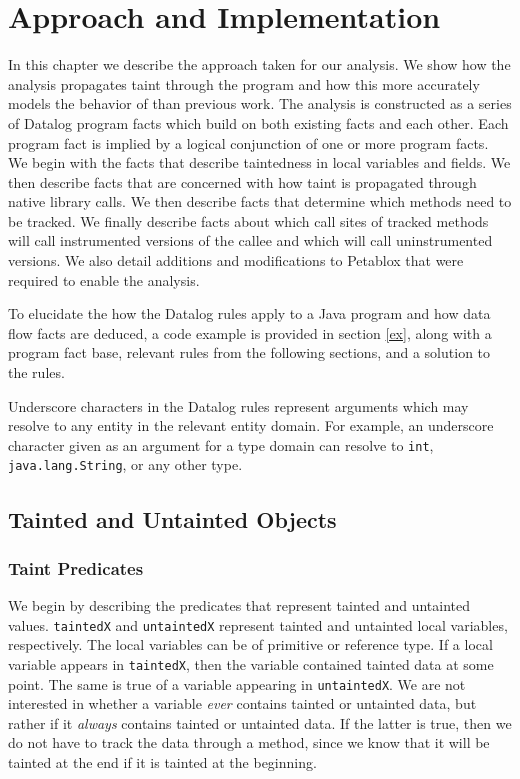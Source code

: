 \chapter{Approach and Implementation}
In this chapter we describe the approach taken for our analysis. We
show how the analysis propagates taint through the program and how
this more accurately models the behavior of \phosphor{} than previous
work. The analysis is constructed as a series of Datalog program facts
which build on both existing facts and each other. Each program fact
is implied by a logical conjunction of one or more program facts. We
begin with the facts that describe taintedness in local variables and
fields. We then describe facts that are concerned with how taint is
propagated through native library calls. We then describe facts that
determine which methods need to be tracked. We finally describe facts
about which call sites of tracked methods will call instrumented
versions of the callee and which will call uninstrumented versions. We
also detail additions and modifications to Petablox that were required
to enable the analysis.

To elucidate the how the Datalog rules apply to a Java program and how
data flow facts are deduced, a code example is provided in section
\ref{ex}, along with a program fact base, relevant rules from the
following sections, and a solution to the rules.

Underscore characters in the Datalog rules represent arguments which
may resolve to any entity in the relevant entity domain. For example,
an underscore character given as an argument for a type domain can
resolve to \texttt{int}, \texttt{java.lang.String}, or any other type.

\section{Tainted and Untainted Objects}
\subsection{Taint Predicates}
We begin by describing the predicates that represent tainted and
untainted values. \texttt{taintedX} and \texttt{untaintedX} represent
tainted and untainted local variables, respectively. The local
variables can be of primitive or reference type. If a local variable
appears in \texttt{taintedX}, then the variable contained tainted data
at some point. The same is true of a variable appearing in
\texttt{untaintedX}. We are not interested in whether a variable
\textit{ever} contains tainted or untainted data, but rather if it
\textit{always} contains tainted or untainted data. If the latter is
true, then we do not have to track the data through a method, since we
know that it will be tainted at the end if it is tainted at the
beginning.

